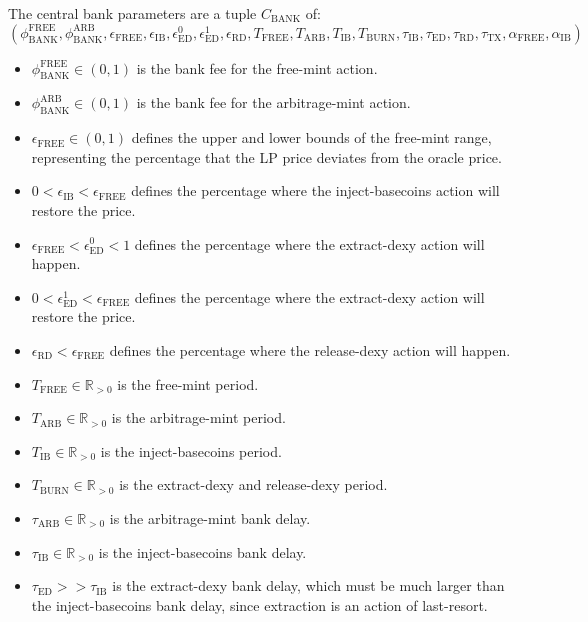 \documentclass{ifcolog}
\begin{document}
The central bank parameters are a tuple $C_{\textrm{BANK}}$ of:
$$\left( \phi_{\textrm{BANK}}^{\textrm{FREE}}, \phi_{\textrm{BANK}}^{\textrm{ARB}}, \epsilon_{\textrm{FREE}}, \epsilon_{\textrm{IB}}, \epsilon_{\textrm{ED}}^{0}, \epsilon_{\textrm{ED}}^{1}, \epsilon_{\textrm{RD}}, T_{\textrm{FREE}}, T_{\textrm{ARB}}, T_{\textrm{IB}}, T_{\textrm{BURN}}, \tau_{\textrm{IB}}, \tau_{\textrm{ED}}, \tau_{\textrm{RD}}, \tau_{\textrm{TX}}, \alpha_{\textrm{FREE}}, \alpha_{\textrm{IB}}  \right)$$

\begin{itemize}
  \item $\phi_{\textrm{BANK}}^{\textrm{FREE}} \in (0, 1)$ is the bank fee for the free-mint action.
  \item $\phi_{\textrm{BANK}}^{\textrm{ARB}} \in (0,1)$ is the bank fee for the arbitrage-mint action.
  \item $\epsilon_{\textrm{FREE}} \in (0, 1)$ defines the upper and lower bounds of the free-mint range, representing the percentage that the LP price deviates from the oracle price.
  \item $0 < \epsilon_{\textrm{IB}} < \epsilon_{\textrm{FREE}}$ defines the percentage where the inject-basecoins action will restore the price.
  \item $\epsilon_{\textrm{FREE}} < \epsilon_{\textrm{ED}}^{0} < 1$ defines the percentage where the extract-dexy action will happen.
  \item $0 < \epsilon_{\textrm{ED}}^{1} < \epsilon_{\textrm{FREE}}$ defines the percentage where the extract-dexy action will restore the price.
  \item $\epsilon_{\textrm{RD}} < \epsilon_{\textrm{FREE}}$ defines the percentage where the release-dexy action will happen.
  \item $T_{\textrm{FREE}} \in \mathbb{R}_{>0}$ is the free-mint period.
  \item $T_{\textrm{ARB}} \in \mathbb{R}_{>0}$ is the arbitrage-mint period.
  \item $T_{\textrm{IB}} \in \mathbb{R}_{>0}$ is the inject-basecoins period.
  \item $T_{\textrm{BURN}} \in \mathbb{R}_{>0}$ is the extract-dexy and release-dexy period.
  \item $\tau_{\textrm{ARB}} \in \mathbb{R}_{>0}$ is the arbitrage-mint bank delay.
  \item $\tau_{\textrm{IB}} \in \mathbb{R}_{>0}$ is the inject-basecoins bank delay.
  \item $\tau_{\textrm{ED}} >> \tau_{\textrm{IB}}$ is the extract-dexy bank delay, which must be much larger than the inject-basecoins bank delay, since extraction is an action of last-resort.

\end{itemize}
\end{document}
